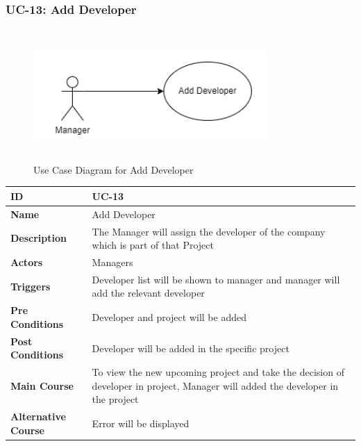 \subsubsection{UC-13: Add Developer}
\begin{figure}[H]
    \includegraphics[height=5cm, width=0.8\textwidth]{./diagrams/Use Case/u13.png}
    \centering
    \caption{Use Case Diagram for Add Developer}
    \label{fig:Usecase1}
\end{figure}

\begin{center}
    \begin{tabularx}{\textwidth}{|l|X|}
        \hline
        \textbf{ID}                 & UC-13                                                                                                                           \\
        \hline
        \textbf{Name}               & Add Developer                                                                                                                   \\
        \hline
        \textbf{Description}        & The Manager will assign the developer of the company which is part of that Project                                              \\
        \hline
        \textbf{Actors}             & Managers                                                                                                                        \\
        \hline
        \textbf{Triggers}           & Developer list will be shown to manager and manager will add the relevant developer                                             \\
        \hline
        \textbf{Pre Conditions}     & Developer and project will be added                                                                                             \\
        \hline
        \textbf{Post Conditions}    & Developer will be added in the specific project                                                                                 \\
        \hline
        \textbf{Main Course}        & To view the new upcoming project and take the decision of developer in project, Manager will added the developer in the project \\
        \hline
        \textbf{Alternative Course} & Error will be displayed                                                                                                         \\
        \hline
    \end{tabularx}
\end{center}

